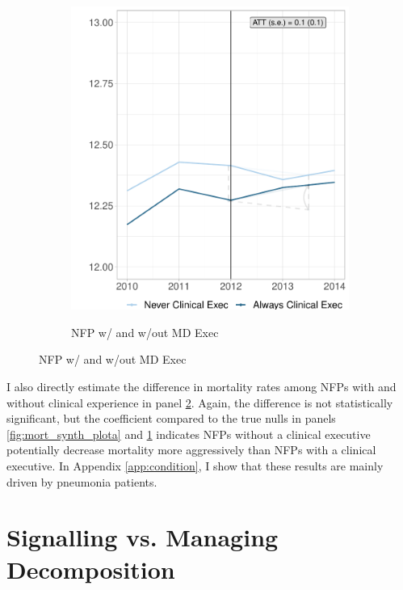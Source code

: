\documentclass[12pt]{article}
\begin{document}
\begin{figure}
\begin{subfigure}[b]{0.45\textwidth}
         \label{fig:mort_synth_plotc}
     \end{subfigure}
     \hfill
     \begin{subfigure}[b]{0.45\textwidth}
         \centering
         \caption{NFP w/ and w/out MD Exec}
         \includegraphics[width=\textwidth]{Objects/mort_md_nomd_synth_graph.pdf}
         \label{fig:mort_synth_plotd}
     \end{subfigure}
        \label{fig:mort_synth_plot}
    \end{figure}

    I also directly estimate the difference in mortality rates among NFPs with and without clinical experience in panel \ref{fig:mort_synth_plotd}. Again, the difference is not statistically significant, but the coefficient compared to the true nulls in panels \ref{fig:mort_synth_plota} and \ref{fig:mort_synth_plotc} indicates NFPs without a clinical executive potentially decrease mortality more aggressively than NFPs with a clinical executive. In Appendix \ref{app:condition}, I show that these results are mainly driven by pneumonia patients.  

\section{Signalling vs. Managing Decomposition}
\end{document}

